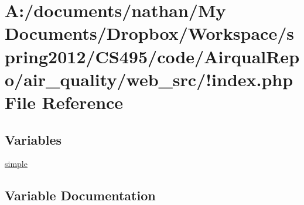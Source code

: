 \hypertarget{_9index_8php}{\section{A\-:/documents/nathan/\-My Documents/\-Dropbox/\-Workspace/spring2012/\-C\-S495/code/\-Airqual\-Repo/air\-\_\-quality/web\-\_\-src/!index.php File Reference}
\label{_9index_8php}
}
\subsection*{Variables}
\begin{DoxyCompactItemize}
\item 
\hyperlink{_9index_8php_a3f239f68a035d40e1891d8b5fdf032d3}{simple}
\end{DoxyCompactItemize}


\subsection{Variable Documentation}
\hypertarget{_9index_8php_a3f239f68a035d40e1891d8b5fdf032d3}{
\subsubsection[{simple}]{}}\label{_9index_8php_a3f239f68a035d40e1891d8b5fdf032d3}

